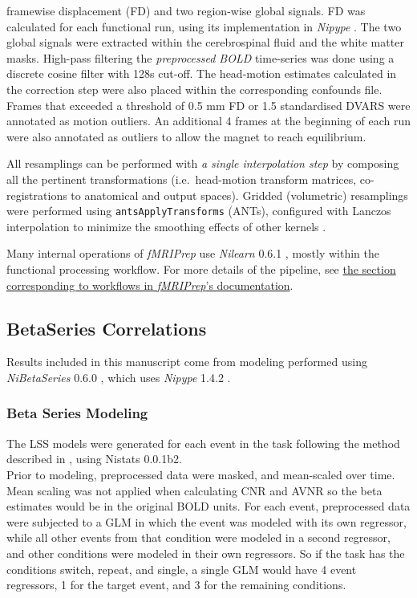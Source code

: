 \documentclass[10pt,letterpaper]{article}
\begin{document}
\begin{description}
framewise displacement (FD) and two region-wise global signals.
FD was calculated for each functional run, using its
implementation in \emph{Nipype} \cite[following the definitions
by]{power_fd_dvars}.
The two global signals were extracted within the
cerebrospinal fluid and the white matter masks.
High-pass filtering the \emph{preprocessed BOLD} time-series was done using
a discrete cosine filter with 128s cut-off.
The head-motion estimates calculated in
the correction step were also placed within the corresponding confounds file. 
Frames that exceeded a threshold of 0.5 mm FD or 1.5 standardised DVARS
were annotated as motion outliers.
An additional 4 frames at the beginning of each run were also
annotated as outliers to allow the magnet to reach equilibrium.

All resamplings can be performed with \emph{a single interpolation step} by composing all the pertinent
transformations (i.e.~head-motion transform matrices, co-registrations to anatomical
and output spaces).
Gridded (volumetric) resamplings were performed using \texttt{antsApplyTransforms} (ANTs),
configured with Lanczos interpolation to minimize the smoothing effects of other kernels
\cite{lanczos}.
\end{description}

Many internal operations of \emph{fMRIPrep} use \emph{Nilearn} 0.6.1
\cite[RRID:SCR\_001362]{nilearn}, mostly within the functional
processing workflow. For more details of the pipeline, see
\href{https://fmriprep.readthedocs.io/en/latest/workflows.html}{the
section corresponding to workflows in \emph{fMRIPrep}'s documentation}.

\subsection{BetaSeries Correlations}

Results included in this manuscript come from modeling performed using
\emph{NiBetaSeries} 0.6.0 \cite{Kent2018}, which uses
\emph{Nipype} 1.4.2 \cite{Gorgolewski2011, Gorgolewski2018}.

\hypertarget{beta-series-modeling}{%
\subsubsection{Beta Series Modeling}\label{beta-series-modeling}}

The LSS models were generated for each event in
the task following the method described in \cite{Turner2012a}, using
Nistats 0.0.1b2.\\
Prior to modeling, preprocessed data were masked, and mean-scaled over
time.
Mean scaling was not applied when calculating CNR and AVNR so the
beta estimates would be in the original BOLD units.
For each event, preprocessed data were subjected to a GLM
in which the event was modeled with its own regressor, while
all other events from that condition were modeled in a second regressor,
and other conditions were modeled in their own regressors.
So if the task has the conditions switch, repeat, and single, 
a single GLM would have 4 event regressors, 1 for the target
event, and 3 for the remaining conditions.
\end{document}
